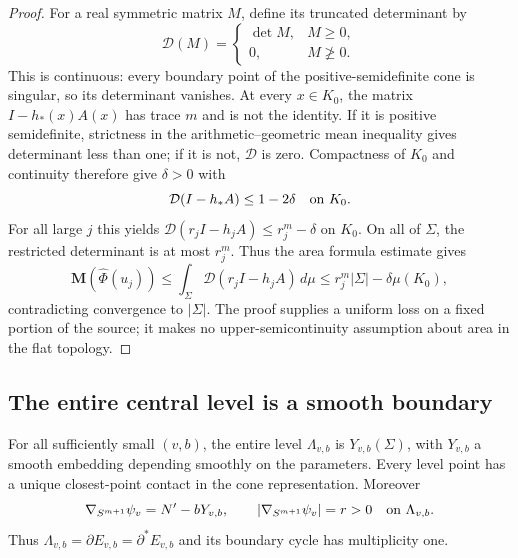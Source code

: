\begin{proof}
For a real symmetric matrix $M$, define its truncated determinant by
\[
 \mathcal D(M)=
 \begin{cases}
  \det M,&M\ge0,\\
  0,&M\not\ge0.
 \end{cases}
\]
This is continuous: every boundary point of the positive-semidefinite
cone is singular, so its determinant vanishes.
At every $x\in K_0$, the matrix $I-h_*(x)A(x)$ has trace $m$ and is
not the identity.  If it is positive semidefinite, strictness in the
arithmetic--geometric mean inequality gives determinant less than
one; if it is not, $\mathcal D$ is zero.
Compactness of $K_0$ and continuity therefore give $\delta>0$ with
\[
 \mathcal D(I-h_*A)\le1-2\delta\quad\hbox{on }K_0.
\]
For all large $j$ this yields
$\mathcal D(r_jI-h_jA)\le r_j^m-\delta$ on $K_0$.
On all of $\Sigma$, the restricted determinant is at most $r_j^m$.
Thus the area formula estimate gives
\[
 \mathbf M(\widehat\Phi(u_j))
 \le\int_\Sigma\mathcal D(r_jI-h_jA)\,d\mu
 \le r_j^m|\Sigma|-\delta\mu(K_0),
\]
contradicting convergence to $|\Sigma|$.
The proof supplies a uniform loss on a fixed portion of the source;
it makes no upper-semicontinuity assumption about area in the flat
topology.
\end{proof}

\subsection{The entire central level is a smooth boundary}

\begin{lemma}\label{lem:family-central-tube}
For all sufficiently small $(v,b)$, the entire level
$\Lambda_{v,b}$ is $Y_{v,b}(\Sigma)$, with $Y_{v,b}$ a smooth
embedding depending smoothly on the parameters.  Every level point
has a unique closest-point contact in the cone representation.
Moreover
\begin{equation}\label{eq:family-regular-level}
 \nabla_{S^{m+1}}\psi_v=N'-bY_{v,b},\qquad
 |\nabla_{S^{m+1}}\psi_v|=r>0
 \quad\hbox{on }\Lambda_{v,b}.
\end{equation}
Thus $\Lambda_{v,b}=\partial E_{v,b}=\partial^*E_{v,b}$ and its
boundary cycle has multiplicity one.
\end{lemma}


